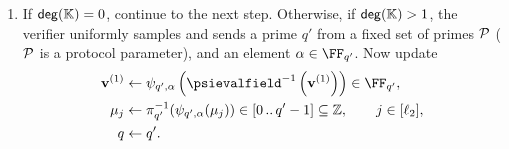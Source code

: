 \documentclass[11pt,letterpaper,usenames,dvipsnames]{article}
\begin{document}
\begin{construction}
\begin{enumerate}[leftmargin=*]
In \cref{?} we describe a variation in which, instead of sending the elements $\mu_1, \ldots, \mu_{\codedim_2}$, the prover commits to their bit-decomposition over $\comfield$, and proves \eqref{e:tensor_decomposition_reconstruction} the present IOR. This saves on proof size and verifier time when $\codedim$ is large.
\item If $\mathsf{deg}(\mathbb{K})=0$, continue to the next step. Otherwise, if $\mathsf{deg}(\mathbb{K})>1$, the verifier uniformly samples and sends a  prime $q'$ from a fixed set of primes $\mathcal{P}$ ($\mathcal{P}$ is a protocol parameter), and an element $\alpha\in \FF_{q'}$. Now update
%
\begin{align*}
\vv^{(1)}{} &\gets \psi_{q',\alpha}\left(\psievalfield^{-1}\left(\vv^{(1)}\right)\right) \in \FF_{q'},\\
\mu_j &\gets \pi_{q'}^{-1}(\psi_{q',\alpha}(\mu_j)) \in \range{0}{q'-1}\subseteq \ZZ, \qquad j\in [\codedim_2],\\
q&\gets q'.
\end{align*}
%


\end{enumerate}
\end{construction}
\end{document}
